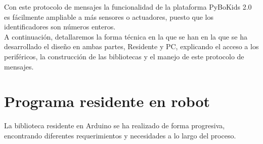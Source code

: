 Con este protocolo de mensajes la funcionalidad de la plataforma PyBoKids 2.0 es fácilmente ampliable a más sensores o actuadores, puesto que los identificadores son números enteros. \\

A continuación, detallaremos la forma técnica en la que se han en la que se ha desarrollado el diseño en ambas partes, Residente y PC, explicando el acceso a los periféricos, la construcción de las bibliotecas y el manejo de este protocolo de mensajes. 
\section{Programa residente en robot}\label{sec:residente}
La biblioteca residente en Arduino se ha realizado de forma progresiva, encontrando diferentes requerimientos y necesidades a lo largo del proceso. 
